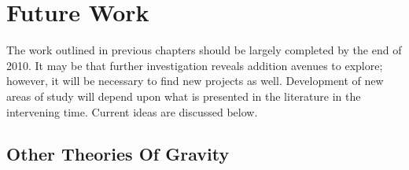 \chapter{Future Work}

The work outlined in previous chapters should be largely completed by the end of 2010. It may be that further investigation reveals addition avenues to explore; however, it will be necessary to find new projects as well. Development of new areas of study will depend upon what is presented in the literature in the intervening time. Current ideas are discussed below.

\section{Other Theories Of Gravity}

